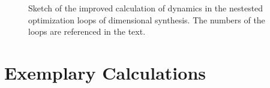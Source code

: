 \documentclass{svproc}
\begin{document}
\begin{figure}[tb]
    
    \caption{Sketch of the improved calculation of dynamics in the nestested optimization loops of dimensional synthesis. The numbers of the loops are referenced in the text.}
    \label{fig:dimsynth_dyn_plin}
\end{figure} 




\section{Exemplary Calculations}
\label{sec:Example}
\end{document}
